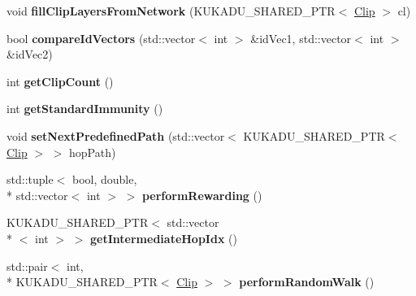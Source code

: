 \begin{DoxyCompactItemize}
\item 
\hypertarget{classkukadu_1_1ProjectiveSimulator_ac828f78597b965f87e702dd0642fa08f}{void {\bfseries fill\-Clip\-Layers\-From\-Network} (K\-U\-K\-A\-D\-U\-\_\-\-S\-H\-A\-R\-E\-D\-\_\-\-P\-T\-R$<$ \hyperlink{classkukadu_1_1Clip}{Clip} $>$ cl)}\label{classkukadu_1_1ProjectiveSimulator_ac828f78597b965f87e702dd0642fa08f}

\item 
\hypertarget{classkukadu_1_1ProjectiveSimulator_aacb71a7ed83541dcfc383ee3e47c55d5}{bool {\bfseries compare\-Id\-Vectors} (std\-::vector$<$ int $>$ \&id\-Vec1, std\-::vector$<$ int $>$ \&id\-Vec2)}\label{classkukadu_1_1ProjectiveSimulator_aacb71a7ed83541dcfc383ee3e47c55d5}

\item 
\hypertarget{classkukadu_1_1ProjectiveSimulator_ab0de7a9e711ccdb9f162913a8aae532b}{int {\bfseries get\-Clip\-Count} ()}\label{classkukadu_1_1ProjectiveSimulator_ab0de7a9e711ccdb9f162913a8aae532b}

\item 
\hypertarget{classkukadu_1_1ProjectiveSimulator_a3b53862020f96d5d98d197b9c0c54327}{int {\bfseries get\-Standard\-Immunity} ()}\label{classkukadu_1_1ProjectiveSimulator_a3b53862020f96d5d98d197b9c0c54327}

\item 
\hypertarget{classkukadu_1_1ProjectiveSimulator_a6f0f3cb8481c1cf3c5597db2acd1d9ba}{void {\bfseries set\-Next\-Predefined\-Path} (std\-::vector$<$ K\-U\-K\-A\-D\-U\-\_\-\-S\-H\-A\-R\-E\-D\-\_\-\-P\-T\-R$<$ \hyperlink{classkukadu_1_1Clip}{Clip} $>$ $>$ hop\-Path)}\label{classkukadu_1_1ProjectiveSimulator_a6f0f3cb8481c1cf3c5597db2acd1d9ba}

\item 
\hypertarget{classkukadu_1_1ProjectiveSimulator_ad27a256005f9bbd8648fc95e874a8326}{std\-::tuple$<$ bool, double, \\*
std\-::vector$<$ int $>$ $>$ {\bfseries perform\-Rewarding} ()}\label{classkukadu_1_1ProjectiveSimulator_ad27a256005f9bbd8648fc95e874a8326}

\item 
\hypertarget{classkukadu_1_1ProjectiveSimulator_a243c3f0fd4eb0ccf9550f7a0e1f156ba}{K\-U\-K\-A\-D\-U\-\_\-\-S\-H\-A\-R\-E\-D\-\_\-\-P\-T\-R$<$ std\-::vector\\*
$<$ int $>$ $>$ {\bfseries get\-Intermediate\-Hop\-Idx} ()}\label{classkukadu_1_1ProjectiveSimulator_a243c3f0fd4eb0ccf9550f7a0e1f156ba}

\item 
\hypertarget{classkukadu_1_1ProjectiveSimulator_af859deb73d3d23eeb6182e197905015b}{std\-::pair$<$ int, \\*
K\-U\-K\-A\-D\-U\-\_\-\-S\-H\-A\-R\-E\-D\-\_\-\-P\-T\-R$<$ \hyperlink{classkukadu_1_1Clip}{Clip} $>$ $>$ {\bfseries perform\-Random\-Walk} ()}\label{classkukadu_1_1ProjectiveSimulator_af859deb73d3d23eeb6182e197905015b}


\end{DoxyCompactItemize}
